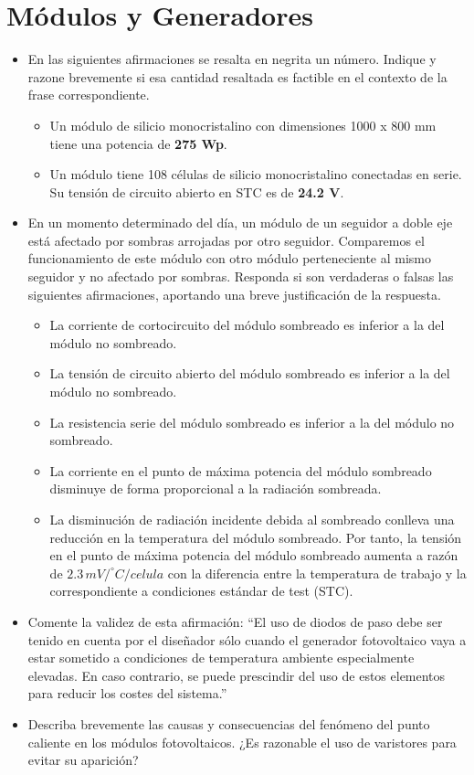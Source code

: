 \documentclass[article, a4paper]{memoir}
\begin{document}
\section*{Módulos y Generadores}
\label{sec:orge864506}
\begin{itemize}
\item En las siguientes afirmaciones se resalta en negrita un
número. Indique y razone brevemente si esa cantidad resaltada es
factible en el contexto de la frase correspondiente.
\begin{itemize}
\item Un módulo de silicio monocristalino con dimensiones 1000 x 800 mm
tiene una potencia de \textbf{275 Wp}.

\item Un módulo tiene 108 células de silicio monocristalino conectadas
en serie. Su tensión de circuito abierto en STC es de \textbf{24.2 V}.
\end{itemize}

\item En un momento determinado del día, un módulo de un seguidor a doble
eje está afectado por sombras arrojadas por otro
seguidor. Comparemos el funcionamiento de este módulo con otro
módulo perteneciente al mismo seguidor y no afectado por
sombras. Responda si son verdaderas o falsas las siguientes
afirmaciones, aportando una breve justificación de la respuesta.
\begin{itemize}
\item La corriente de cortocircuito del módulo sombreado es inferior a la
del módulo no sombreado.

\item La tensión de circuito abierto del módulo sombreado es inferior a la del módulo no sombreado.
\item La resistencia serie del módulo sombreado es inferior a la del módulo no sombreado.
\item La corriente en el punto de máxima potencia del módulo sombreado disminuye de forma proporcional a la radiación sombreada.
\item La disminución de radiación incidente debida al sombreado conlleva
una reducción en la temperatura del módulo sombreado. Por tanto, la
tensión en el punto de máxima potencia del módulo sombreado aumenta
a razón de \(2.3\,mV/^{\circ}C/celula\) con la diferencia entre la
temperatura de trabajo y la correspondiente a condiciones estándar
de test (STC).
\end{itemize}

\item Comente la validez de esta afirmación: ``El uso de diodos de paso
debe ser tenido en cuenta por el diseñador sólo cuando el generador
fotovoltaico vaya a estar sometido a condiciones de temperatura
ambiente especialmente elevadas. En caso contrario, se puede
prescindir del uso de estos elementos para reducir los costes del
sistema.''

\item Describa brevemente las causas y consecuencias del fenómeno del
punto caliente en los módulos fotovoltaicos. ¿Es razonable el uso de
varistores para evitar su aparición?
\end{itemize}
\end{document}
